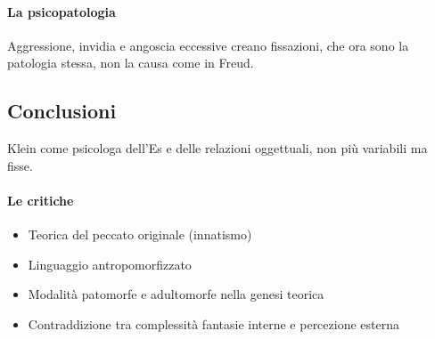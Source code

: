 \documentclass[12pt, a4paper]{article}
\begin{document}
\paragraph{La psicopatologia} Aggressione, invidia e angoscia eccessive creano fissazioni, che ora sono la patologia stessa, non la causa come in Freud.

\subsection{Conclusioni}
Klein come psicologa dell'Es e delle relazioni oggettuali, non pi\`u variabili ma fisse.
\paragraph{Le critiche} 
\begin{itemize}
    \item Teorica del peccato originale (innatismo)
    \item Linguaggio antropomorfizzato
    \item Modalit\`a patomorfe e adultomorfe nella genesi teorica
    \item Contraddizione tra complessit\`a fantasie interne e percezione esterna
\end{itemize}
\end{document}
